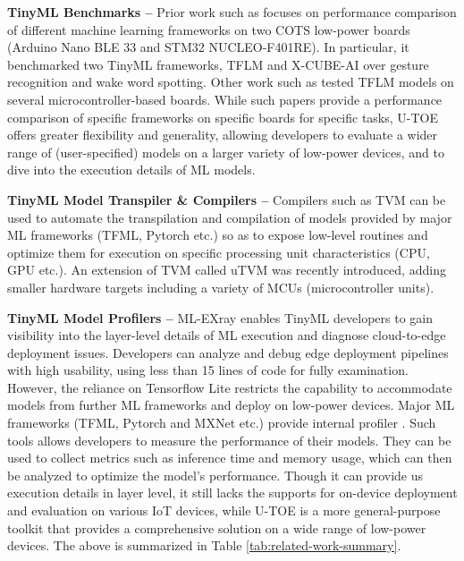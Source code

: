 {\bf TinyML Benchmarks --} 
Prior work such as \cite{osman2022tinyml-bench} focuses on performance comparison of different machine learning frameworks on two COTS low-power boards (Arduino Nano BLE 33 and STM32 NUCLEO-F401RE). In particular, it benchmarked two TinyML frameworks, TFLM and X-CUBE-AI over gesture recognition and wake word spotting. Other work such as \cite{sudharsan2021tinyml-bench} tested TFLM models on several microcontroller-based boards. While such papers provide a performance comparison of specific frameworks on specific boards for specific tasks, U-TOE offers greater flexibility and generality, allowing developers to evaluate a wider range of (user-specified) models on a larger variety of low-power devices, and to dive into the execution details of ML models.
 
{\bf TinyML Model Transpiler \& Compilers --}
Compilers such as TVM \cite{chen2018tvm} can be used to automate the transpilation and compilation of models provided by major ML frameworks (TFML, Pytorch etc.) so as to expose low-level routines and optimize them for execution on specific processing unit characteristics (CPU, GPU etc.). An extension of TVM called uTVM was recently introduced, adding smaller hardware targets including a variety of MCUs (microcontroller units).

{\bf TinyML Model Profilers --}
ML-EXray\cite{qiu2022ml-xray} enables TinyML developers to gain visibility into the layer-level details of ML execution and diagnose cloud-to-edge deployment issues. Developers can analyze and debug edge deployment pipelines with high usability, using less than 15 lines of code for fully examination. However, the reliance on Tensorflow Lite restricts the capability to accommodate models from further ML frameworks and deploy on low-power devices.
Major ML frameworks (TFML, Pytorch and MXNet etc.) provide internal profiler \cite{2023_yousefzadeh-asl-miandoab_ProfilingMonitoringDeep}. Such tools allows developers to measure the performance of their models. They can be used to collect metrics such as inference time and memory usage, which can then be analyzed to optimize the model's performance. Though it can provide us execution details in layer level, it still lacks the supports for on-device deployment and evaluation on various IoT devices, while U-TOE is a more general-purpose toolkit that provides a comprehensive solution on a wide range of low-power devices. The above is summarized in Table \ref{tab:related-work-summary}.

